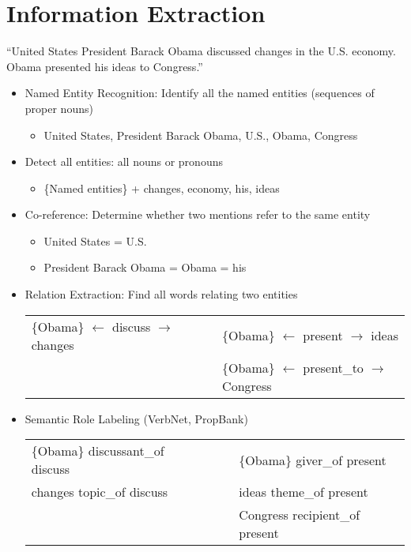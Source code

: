 \documentclass[11pt,letterpaper]{article}
\begin{document}
\section{Information Extraction}

``United States President Barack Obama discussed changes in the U.S. economy.  Obama presented his ideas to Congress.''

\begin{itemize}
  \item Named Entity Recognition: Identify all the named entities (sequences of proper nouns)
    \begin{itemize}
      \item United States, President Barack Obama, U.S., Obama, Congress
    \end{itemize}
  \item Detect all entities: all nouns or pronouns
    \begin{itemize}
      \item \{Named entities\} + changes, economy, his, ideas
    \end{itemize}
  \item Co-reference: Determine whether two mentions refer to the same entity
    \begin{itemize}
      \item United States = U.S.
      \item President Barack Obama = Obama = his
    \end{itemize}
  \item Relation Extraction: Find all words relating two entities \vspace{2mm}\\
    \begin{tabular}{llll}
      \{Obama\} $\leftarrow$ discuss $\rightarrow$ changes 
          &&& \{Obama\} $\leftarrow$ present $\rightarrow$ ideas\\
          &&& \{Obama\} $\leftarrow$ present\_to $\rightarrow$ Congress
    \end{tabular}
  \item Semantic Role Labeling (VerbNet, PropBank) \vspace{2mm}\\
    \begin{tabular}{llll}
      \{Obama\} discussant\_of discuss
          &&& \{Obama\} giver\_of present \\
      changes topic\_of discuss 
          &&& ideas theme\_of present \\
          &&& Congress recipient\_of present
    \end{tabular}
\end{itemize}
\end{document}
